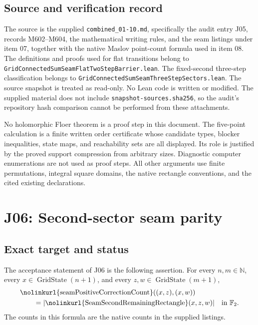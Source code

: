 \documentclass[11pt,oneside]{report}
\theoremstyle{definition}
\numberwithin{equation}{section}
\newcommand{\F}{\mathbb F_2}
\newcommand{\nat}{\mathbb N}
\newcommand{\decl}[1]{\textnormal{\nolinkurl{#1}}}
\newcommand{\seamcard}[1]{\lvert #1\rvert}
\begin{document}
\section{Source and verification record}

The source is the supplied \decl{combined_01-10.md}, specifically the audit
entry J05, records M602--M604, the mathematical writing rules, and the seam
listings under item 07, together with the native Maslov point-count formula
used in item 08. The definitions and proofs used for flat transitions
belong to \decl{GridConnectedSumSeamFlatTwoStepBarrier.lean}.
The fixed-second three-step classification belongs to
\decl{GridConnectedSumSeamThreeStepSectors.lean}.
The source snapshot is treated as read-only. No Lean code is written or
modified. The supplied material does not include
\decl{snapshot-sources.sha256}, so the audit's repository hash comparison
cannot be performed from these attachments.

No holomorphic Floer theorem is a proof step in this document.
The five-point calculation is a finite written order certificate whose
candidate types, blocker inequalities, state maps, and reachability sets
are all displayed. Its role is justified by the proved support compression
from arbitrary sizes. Diagnostic computer enumerations are not used as
proof steps. All other arguments use finite permutations, integral square
domains, the native rectangle conventions, and the cited existing declarations.


\chapter{J06: Second-sector seam parity}
\label{chapter:J06}



\section{Exact target and status}

The acceptance statement of J06 is the following assertion. For every
$n,m\in\nat$, every $x\in\operatorname{GridState}(n+1)$, and every
$z,w\in\operatorname{GridState}(m+1)$,
\begin{equation}\label{J06:eq:target}
 \begin{aligned}
 &\decl{seamPositiveCorrectionCount}((x,z),(x,w))\\
 &\qquad=\seamcard{\decl{SeamSecondRemainingRectangle}(x,z,w)}
 \quad\text{in }\F.
 \end{aligned}
\end{equation}
The counts in this formula are the native counts in the supplied listings.
\end{document}

